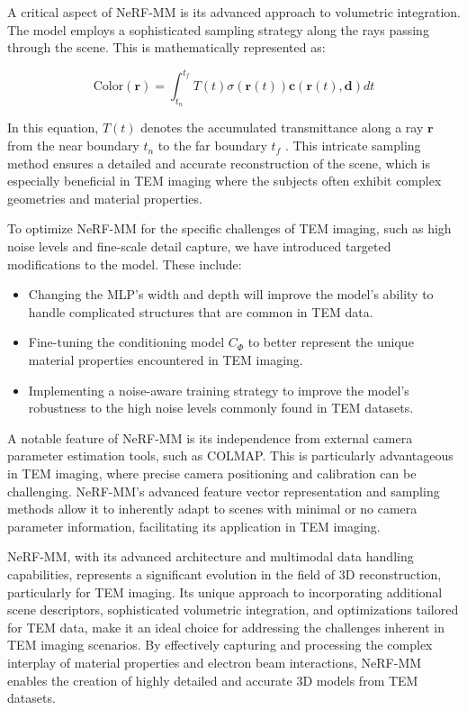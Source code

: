 \vspace{10pt}
A critical aspect of NeRF-MM is its advanced approach to volumetric integration. The model employs a sophisticated sampling strategy along the rays passing through the scene. This is mathematically represented as:

\begin{equation}
\text{Color}(\mathbf{r}) = \int_{t_n}^{t_f} T(t) \sigma(\mathbf{r}(t)) \mathbf{c}(\mathbf{r}(t), \mathbf{d}) dt
\end{equation}

In this equation, \( T(t) \) denotes the accumulated transmittance along a ray \( \mathbf{r} \) from the near boundary \( t_n \) to the far boundary \( t_f \) \cite{Wang2021}. This intricate sampling method ensures a detailed and accurate reconstruction of the scene, which is especially beneficial in TEM imaging where the subjects often exhibit complex geometries and material properties.

\vspace{10pt}

To optimize NeRF-MM for the specific challenges of TEM imaging, such as high noise levels and fine-scale detail capture, we have introduced targeted modifications to the model. These include:

\begin{itemize}
  \item Changing the MLP's width and depth will improve the model's ability to handle complicated structures that are common in TEM data.
  \item Fine-tuning the conditioning model \( C_\Phi \) to better represent the unique material properties encountered in TEM imaging.
  \item Implementing a noise-aware training strategy to improve the model's robustness to the high noise levels commonly found in TEM datasets.
\end{itemize}


A notable feature of NeRF-MM is its independence from external camera parameter estimation tools, such as COLMAP. This is particularly advantageous in TEM imaging, where precise camera positioning and calibration can be challenging. NeRF-MM's advanced feature vector representation and sampling methods allow it to inherently adapt to scenes with minimal or no camera parameter information, facilitating its application in TEM imaging.


\vspace{10pt}

NeRF-MM, with its advanced architecture and multimodal data handling capabilities, represents a significant evolution in the field of 3D reconstruction, particularly for TEM imaging. Its unique approach to incorporating additional scene descriptors, sophisticated volumetric integration, and optimizations tailored for TEM data, make it an ideal choice for addressing the challenges inherent in TEM imaging scenarios. By effectively capturing and processing the complex interplay of material properties and electron beam interactions, NeRF-MM enables the creation of highly detailed and accurate 3D models from TEM datasets.


